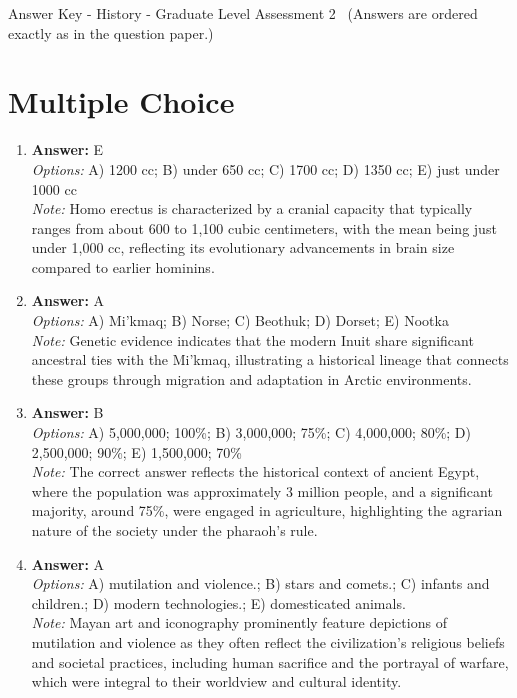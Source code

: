 \documentclass[12pt]{article}
\begin{document}
\begin{center}
Answer Key - History - Graduate Level Assessment 2 \
\small (Answers are ordered exactly as in the question paper.)
\end{center}

\section*{Multiple Choice}
\begin{enumerate}[label=\arabic*.]
\item \textbf{Answer:} E
\\ \textit{Options:} A) 1200 cc; B) under 650 cc; C) 1700 cc; D) 1350 cc; E) just under 1000 cc
\\ \textit{Note:} Homo erectus is characterized by a cranial capacity that typically ranges from about 600 to 1,100 cubic centimeters, with the mean being just under 1,000 cc, reflecting its evolutionary advancements in brain size compared to earlier hominins.
\item \textbf{Answer:} A
\\ \textit{Options:} A) Mi'kmaq; B) Norse; C) Beothuk; D) Dorset; E) Nootka
\\ \textit{Note:} Genetic evidence indicates that the modern Inuit share significant ancestral ties with the Mi'kmaq, illustrating a historical lineage that connects these groups through migration and adaptation in Arctic environments.
\item \textbf{Answer:} B
\\ \textit{Options:} A) 5,000,000; 100\%; B) 3,000,000; 75\%; C) 4,000,000; 80\%; D) 2,500,000; 90\%; E) 1,500,000; 70\%
\\ \textit{Note:} The correct answer reflects the historical context of ancient Egypt, where the population was approximately 3 million people, and a significant majority, around 75\%, were engaged in agriculture, highlighting the agrarian nature of the society under the pharaoh's rule.
\item \textbf{Answer:} A
\\ \textit{Options:} A) mutilation and violence.; B) stars and comets.; C) infants and children.; D) modern technologies.; E) domesticated animals.
\\ \textit{Note:} Mayan art and iconography prominently feature depictions of mutilation and violence as they often reflect the civilization's religious beliefs and societal practices, including human sacrifice and the portrayal of warfare, which were integral to their worldview and cultural identity.

\end{enumerate}
\end{document}
